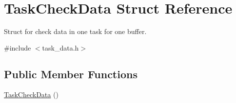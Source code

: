 \hypertarget{structTaskCheckData}{
\section{TaskCheckData Struct Reference}
\label{structTaskCheckData}
}


Struct for check data in one task for one buffer.  


{\ttfamily \#include $<$task\_\-data.h$>$}\subsection*{Public Member Functions}
\begin{DoxyCompactItemize}
\item 
\hyperlink{structTaskCheckData_a44e9d9e9f7edeec5e79010a5305a9c12}{TaskCheckData} ()
\end{DoxyCompactItemize}
